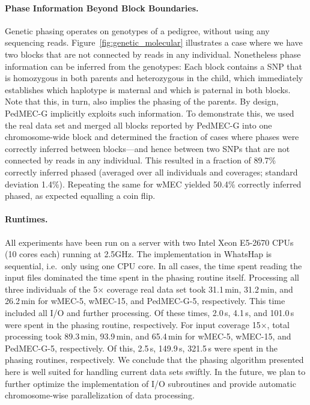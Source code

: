 \paragraph{Phase Information Beyond Block Boundaries.}
Genetic phasing operates on genotypes of a pedigree, without using any sequencing reads.
Figure~\ref{fig:genetic_molecular} illustrates a case where we have two blocks that are not connected by reads in any individual. 
Nonetheless phase information can be inferred from the genotypes: Each block contains a SNP that is homozygous in both parents and heterozygous in the child, which immediately establishes which haplotype is maternal and which is paternal in both blocks.
Note that this, in turn, also implies the phasing of the parents.
By design, PedMEC-G implicitly exploits such information.
To demonstrate this, we used the real data set and merged all blocks reported by PedMEC-G into one chromosome-wide block and determined the fraction of cases where phases were correctly inferred between blocks---and hence between two SNPs that are not connected by reads in any individual.
This resulted in a fraction of 89.7\% correctly inferred phased (averaged over all individuals and coverages; standard deviation 1.4\%).
Repeating the same for wMEC yielded 50.4\% correctly inferred phased, as expected equalling a coin flip.

\paragraph{Runtimes.}
All experiments have been run on a server with two Intel Xeon E5-2670 CPUs (10 cores each) running at 2.5GHz.
The implementation in WhatsHap is sequential, i.e.\ only using one CPU core.
In all cases, the time spent reading the input files dominated the time spent in the phasing routine itself.
Processing all three individuals of the 5$\times$ coverage real data set took 31.1\,min, 31.2\,min, and 26.2\,min for wMEC-5, wMEC-15, and \mbox{PedMEC-G-5}, respectively.
This time included all I/O and further processing.
Of these times, 2.0\,s, 4.1\,s, and 101.0\,s were spent in the phasing routine, respectively.
For input coverage 15$\times$, total processing took 89.3\,min, 93.9\,min, and 65.4\,min for wMEC-5, wMEC-15, and \mbox{PedMEC-G-5}, respectively.
Of this, 2.5\,s, 149.9\,s, 321.5\,s were spent in the phasing routines, respectively.
We conclude that the phasing algorithm presented here is well suited for handling current data sets swiftly.
In the future, we plan to further optimize the implementation of I/O subroutines and provide automatic chromosome-wise parallelization of data processing.

